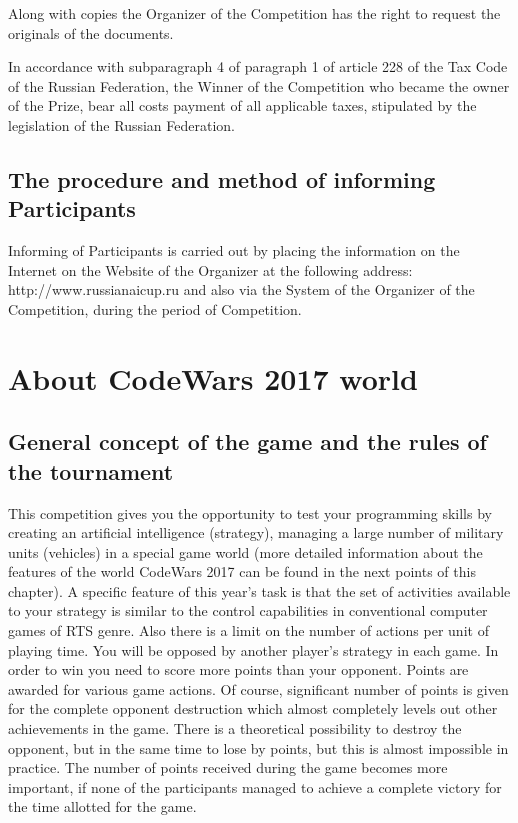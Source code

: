 Along with copies the Organizer of the Competition has the right to request the originals of the documents.

In accordance with subparagraph 4 of paragraph 1 of article 228 of the Tax Code of the Russian Federation, the Winner of the Competition who became the owner of the Prize, bear all costs
payment of all applicable taxes, stipulated by the legislation of the Russian Federation.

\section{The procedure and method of informing Participants}

Informing of Participants is carried out by placing the information on the Internet on the Website of the Organizer at the following address:
http://www.russianaicup.ru and also via the System of the Organizer of the Competition, during the period of Competition.

\chapter{About CodeWars 2017 world}

\section{General concept of the game and the rules of the tournament}

This competition gives you the opportunity to test your programming skills by creating an artificial intelligence (strategy),
managing a large number of military units (vehicles) in a special game world (more detailed information about the features of the world CodeWars 2017 can be
found in the next points of this chapter). A specific feature of this year's task is that the set of activities available to your
strategy is similar to the control capabilities in conventional computer games of RTS genre. Also there is a limit on the number of actions per unit of
playing time. You will be opposed by another player's strategy in each game. In order to win you need to score more points than your opponent.
Points are awarded for various game actions. Of course, significant number of points is given for the complete opponent destruction
which almost completely levels out other achievements in the game. There is a theoretical possibility to destroy the opponent, but in
the same time to lose by points, but this is almost impossible in practice. The number of points received during the game becomes more
important, if none of the participants managed to achieve a complete victory for the time allotted for the game.

